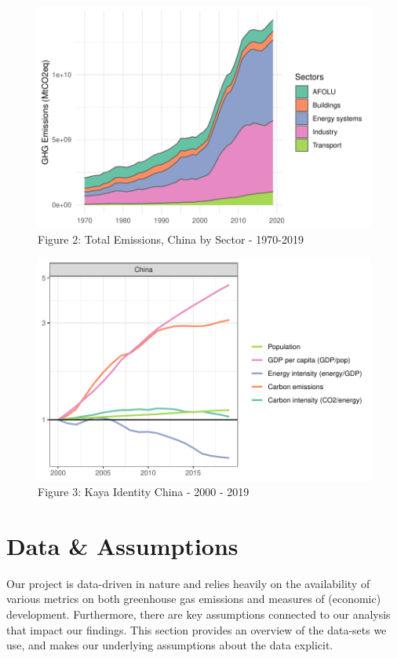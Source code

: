 \documentclass[
  12pt,
]{article}
\numberwithin{equation}{section}
\numberwithin{table}{section}
\numberwithin{figure}{section}
\begin{document}
\begin{figure}
\centering
\includegraphics{Paper_files/figure-latex/unnamed-chunk-2-1.pdf}
\caption{Figure 2: Total Emissions, China by Sector - 1970-2019}
\end{figure}

\begin{figure}
\centering
\includegraphics{Paper_files/figure-latex/unnamed-chunk-3-1.pdf}
\caption{Figure 3: Kaya Identity China - 2000 - 2019}
\end{figure}

\hypertarget{data-assumptions}{%
\section{Data \& Assumptions}\label{data-assumptions}}

Our project is data-driven in nature and relies heavily on the
availability of various metrics on both greenhouse gas emissions and
measures of (economic) development. Furthermore, there are key
assumptions connected to our analysis that impact our findings. This
section provides an overview of the data-sets we use, and makes our
underlying assumptions about the data explicit.
\end{document}
